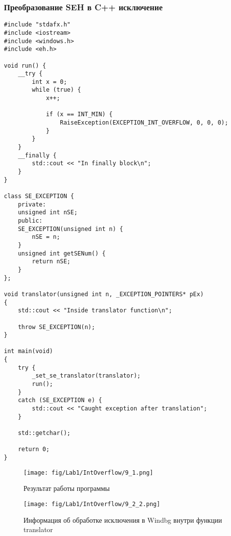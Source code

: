 \subsubsection{Преобразование SEH в C++ исключение}
\begin{lstlisting}[caption=Преобразование SEH в исключение С++]
#include "stdafx.h"
#include <iostream>
#include <windows.h>
#include <eh.h>

void run() {
    __try {
        int x = 0;
        while (true) {
            x++;

            if (x == INT_MIN) {
                RaiseException(EXCEPTION_INT_OVERFLOW, 0, 0, 0);
            }
        }
    }
    __finally {
        std::cout << "In finally block\n";
    }
}

class SE_EXCEPTION {
    private:
    unsigned int nSE;
    public:
    SE_EXCEPTION(unsigned int n) {
        nSE = n;
    }
    unsigned int getSENum() {
        return nSE;
    }
};

void translator(unsigned int n, _EXCEPTION_POINTERS* pEx)
{
    std::cout << "Inside translator function\n";

    throw SE_EXCEPTION(n);
}

int main(void)
{
    try {
        _set_se_translator(translator);
        run();
    }
    catch (SE_EXCEPTION e) {
        std::cout << "Caught exception after translation";
    }

    std::getchar();

    return 0;
}
\end{lstlisting}

\begin{figure}[H]
    \begin{center}
        \texttt{[image: fig/Lab1/IntOverflow/9\_1.png]}
        \caption{Результат работы программы}
        \label{pic:9_1}
    \end{center}
\end{figure}

\begin{figure}[H]
    \begin{center}
        \texttt{[image: fig/Lab1/IntOverflow/9\_2\_2.png]}
        \caption{Информация об обработке исключения в Windbg внутри функции translator}
        \label{pic:9_2_2}
    \end{center}
\end{figure}

